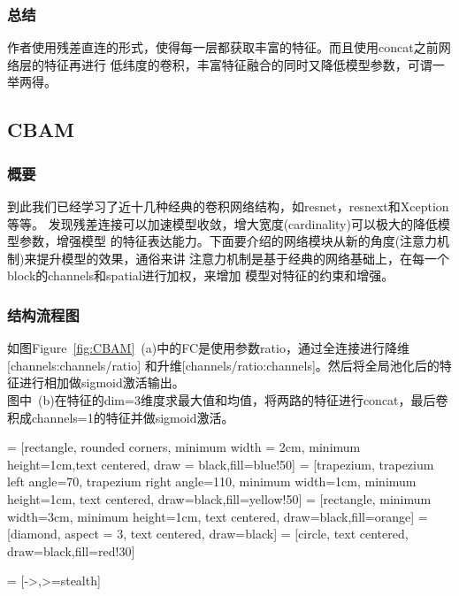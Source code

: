 \documentclass{article}
\begin{document}
\begin{CJK}{UTF8}{gbsn}
\subsubsection{总结}
作者使用残差直连的形式，使得每一层都获取丰富的特征。而且使用concat之前网络层的特征再进行
低纬度的卷积，丰富特征融合的同时又降低模型参数，可谓一举两得。


\subsection{CBAM}
\subsubsection{概要}
到此我们已经学习了近十几种经典的卷积网络结构，如resnet，resnext和Xception等等。
发现残差连接可以加速模型收敛，增大宽度(cardinality)可以极大的降低模型参数，增强模型
的特征表达能力。下面要介绍的网络模块从新的角度(注意力机制)来提升模型的效果，通俗来讲
注意力机制是基于经典的网络基础上，在每一个block的channels和spatial进行加权，来增加
模型对特征的约束和增强。
\subsubsection{结构流程图}
如图Figure~\ref{fig:CBAM}\ (a)中的FC是使用参数ratio，通过全连接进行降维[channels:channels/ratio]
和升维[channels/ratio:channels]。然后将全局池化后的特征进行相加做sigmoid激活输出。\\
图中\ (b)在特征的dim=3维度求最大值和均值，将两路的特征进行concat，最后卷积成channels=1的特征并做sigmoid激活。

\thispagestyle{empty}
 = [rectangle, rounded corners, minimum width = 2cm, minimum height=1cm,text centered, draw = black,fill=blue!50]
 = [trapezium, trapezium left angle=70, trapezium right angle=110, minimum width=1cm, minimum height=1cm, text centered, draw=black,fill=yellow!50]
 = [rectangle, minimum width=3cm, minimum height=1cm, text centered, draw=black,fill=orange]
 = [diamond, aspect = 3, text centered, draw=black]
 = [circle, text centered, draw=black,fill=red!30]

 = [->,>=stealth]
\begin{figure}[H]
    \centering
\end{figure}
\end{CJK}
\end{document}
